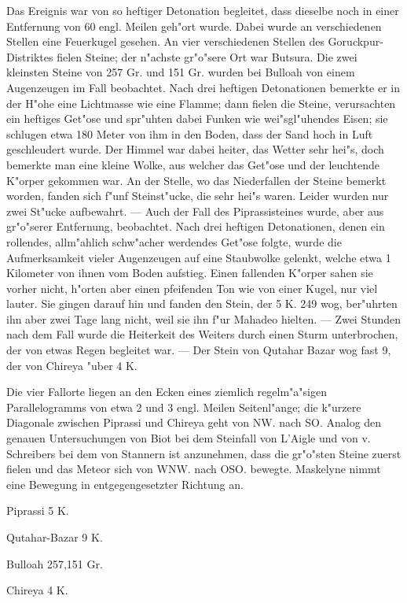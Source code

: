 \documentclass[a4paper, 11pt, oneside]{article}
\begin{document}
Das Ereignis war von so heftiger Detonation begleitet, dass dieselbe noch in einer Entfernung von 60 engl. Meilen geh"ort wurde. Dabei wurde an verschiedenen Stellen eine Feuerkugel gesehen. An vier verschiedenen Stellen des Goruckpur-Distriktes fielen Steine; der n"achste gr"o"sere Ort war Butsura. Die zwei kleinsten Steine von 257 Gr. und 151 Gr. wurden bei Bulloah von einem Augenzeugen im Fall beobachtet. Nach drei heftigen Detonationen bemerkte er in der H"ohe eine Lichtmasse wie eine Flamme; dann fielen die Steine, verursachten ein heftiges Get"ose und spr"uhten dabei Funken wie wei"sgl"uhendes Eisen; sie schlugen etwa 180 Meter von ihm in den Boden, dass der Sand hoch in Luft geschleudert wurde. Der Himmel war dabei heiter, das Wetter sehr hei"s, doch bemerkte man eine kleine Wolke, aus welcher das Get"ose und der leuchtende K"orper gekommen war. An der Stelle, wo das Niederfallen der Steine bemerkt worden, fanden sich f"unf Steinst"ucke, die sehr hei"s waren. Leider wurden nur zwei St"ucke aufbewahrt. --- Auch der Fall des Piprassisteines wurde, aber aus gr"o"serer Entfernung, beobachtet. Nach drei heftigen Detonationen, denen ein rollendes, allm"ahlich schw"acher werdendes Get"ose folgte, wurde die Aufmerksamkeit vieler Augenzeugen auf eine Staubwolke gelenkt, welche etwa 1 Kilometer von ihnen vom Boden aufstieg. Einen fallenden K"orper sahen sie vorher nicht, h"orten aber einen pfeifenden Ton wie von einer Kugel, nur viel lauter. Sie gingen darauf hin und fanden den Stein, der 5 K. 249 wog, ber"uhrten ihn aber zwei Tage lang nicht, weil sie ihn f"ur Mahadeo hielten. --- Zwei Stunden nach dem Fall wurde die Heiterkeit des Weiters durch einen Sturm unterbrochen, der von etwas Regen begleitet war. --- Der Stein von Qutahar Bazar wog fast 9, der von Chireya "uber 4 K.

Die vier Fallorte liegen an den Ecken eines ziemlich regelm"a"sigen Parallelogramms von etwa 2 und 3 engl. Meilen Seitenl"ange; die k"urzere Diagonale zwischen Piprassi und Chireya geht von NW. nach SO. Analog den genauen Untersuchungen von Biot bei dem Steinfall von L'Aigle und von v. Schreibers bei dem von Stannern ist anzunehmen, dass die gr"o"sten Steine zuerst fielen und das Meteor sich von WNW. nach OSO. bewegte. Maskelyne nimmt eine Bewegung in entgegengesetzter Richtung an.

Piprassi  
5 K.

Qutahar-Bazar  
9 K.

Bulloah  
257,151 Gr.

Chireya  
4 K.
\end{document}
